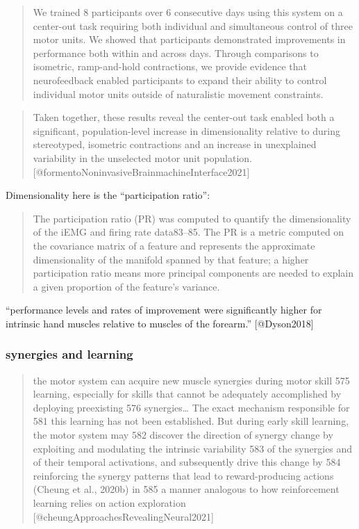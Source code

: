 \begin{quote}
We trained 8 participants over 6 consecutive days using this system on a
center-out task requiring both individual and simultaneous control of
three motor units. We showed that participants demonstrated improvements
in performance both within and across days. Through comparisons to
isometric, ramp-and-hold contractions, we provide evidence that
neurofeedback enabled participants to expand their ability to control
individual motor units outside of naturalistic movement constraints.
\end{quote}

\begin{quote}
Taken together, these results reveal the center-out task enabled both a
significant, population-level increase in dimensionality relative to
during stereotyped, isometric contractions and an increase in
unexplained variability in the unselected motor unit population.
{[}@formentoNoninvasiveBrainmachineInterface2021{]}
\end{quote}

Dimensionality here is the ``participation ratio'':

\begin{quote}
The participation ratio (PR) was computed to quantify the dimensionality
of the iEMG and firing rate data83--85. The PR is a metric computed on
the covariance matrix of a feature and represents the approximate
dimensionality of the manifold spanned by that feature; a higher
participation ratio means more principal components are needed to
explain a given proportion of the feature's variance.
\end{quote}

``performance levels and rates of improvement were significantly higher
for intrinsic hand muscles relative to muscles of the forearm.''
{[}@Dyson2018{]}

\subsubsection{synergies and learning}\label{synergies-and-learning}

\begin{quote}
the motor system can acquire new muscle synergies during motor skill 575
learning, especially for skills that cannot be adequately accomplished
by deploying preexisting 576 synergies\ldots{} The exact mechanism
responsible for 581 this learning has not been established. But during
early skill learning, the motor system may 582 discover the direction of
synergy change by exploiting and modulating the intrinsic variability
583 of the synergies and of their temporal activations, and subsequently
drive this change by 584 reinforcing the synergy patterns that lead to
reward-producing actions (Cheung et al., 2020b) in 585 a manner
analogous to how reinforcement learning relies on action exploration
{[}@cheungApproachesRevealingNeural2021{]}
\end{quote}

